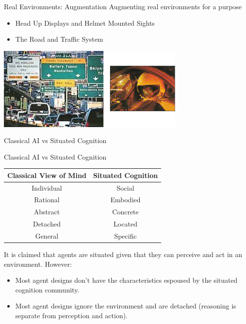 \documentclass[aspectratio=1610,xcolor=dvipsnames,t]{beamer}
\begin{document}
\begin{frame}{Real Environments: Augmentation} 
    Augmenting real environments for a purpose
    \begin{itemize}
        \item Head Up Displays and Helmet Mounted Sights
        \item The Road and Traffic System
    \end{itemize}
    \begin{center}
        \includegraphics[width=0.7\textwidth]{augmentation} 
    \end{center}
\end{frame} 

\begin{frame}{Classical AI vs Situated Cognition}
    \begin{block}{Classical AI vs Situated Cognition}
    \begin{center}
    \begin{tabular}{cc} \hline
        \textbf{Classical View of Mind}  &   \textbf{Situated Cognition} \\ \hline
            Individual              &   Social \\
            Rational                &   Embodied \\
            Abstract                &   Concrete \\
            Detached                &   Located \\
            General                 &   Specific \\ \hline
    \end{tabular} 
    \end{center} 
    \end{block} 

    It is claimed that agents are situated given that they
    can perceive and act in an environment. However:
    \begin{itemize}
        \item Most agent designs don't have the characteristics
            espoused by the situated cognition community.
        \item Most agent designs ignore the environment and are
            detached (reasoning is separate from perception and action).
    \end{itemize}
            

\end{frame} 
\end{document}
